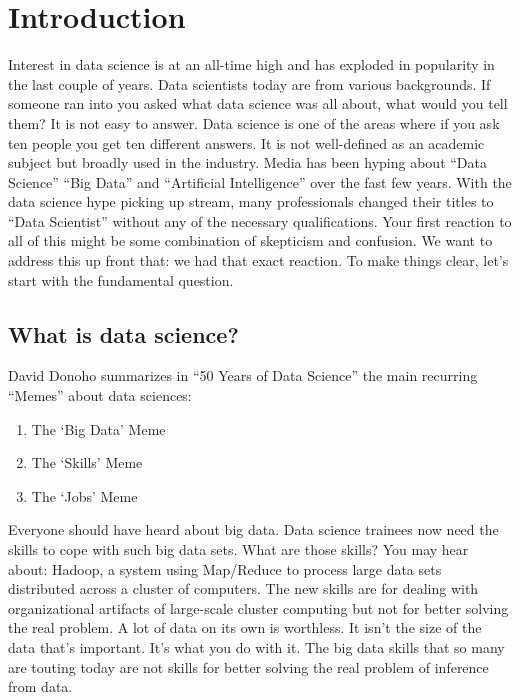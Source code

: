 \documentclass[12pt,]{krantz}
\providecommand{\tightlist}{%
  \setlength{\itemsep}{0pt}\setlength{\parskip}{0pt}}
\theoremstyle{definition}
\theoremstyle{definition}
\theoremstyle{remark}
\begin{document}
\mainmatter

\chapter{Introduction}\label{introduction}

Interest in data science is at an all-time high and has exploded in
popularity in the last couple of years. Data scientists today are from
various backgrounds. If someone ran into you asked what data science was
all about, what would you tell them? It is not easy to answer. Data
science is one of the areas where if you ask ten people you get ten
different answers. It is not well-defined as an academic subject but
broadly used in the industry. Media has been hyping about ``Data
Science'' ``Big Data'' and ``Artificial Intelligence'' over the fast few
years. With the data science hype picking up stream, many professionals
changed their titles to ``Data Scientist'' without any of the necessary
qualifications. Your first reaction to all of this might be some
combination of skepticism and confusion. We want to address this up
front that: we had that exact reaction. To make things clear, let's
start with the fundamental question.

\section{What is data science?}\label{what-is-data-science}

David Donoho \citep{data50} summarizes in ``50 Years of Data Science''
the main recurring ``Memes'' about data sciences:

\begin{enumerate}
\def\labelenumi{\arabic{enumi}.}
\tightlist
\item
  The `Big Data' Meme
\item
  The `Skills' Meme
\item
  The `Jobs' Meme
\end{enumerate}

Everyone should have heard about big data. Data science trainees now
need the skills to cope with such big data sets. What are those skills?
You may hear about: Hadoop, a system using Map/Reduce to process large
data sets distributed across a cluster of computers. The new skills are
for dealing with organizational artifacts of large-scale cluster
computing but not for better solving the real problem. A lot of data on
its own is worthless. It isn't the size of the data that's important.
It's what you do with it. The big data skills that so many are touting
today are not skills for better solving the real problem of inference
from data.
\end{document}
